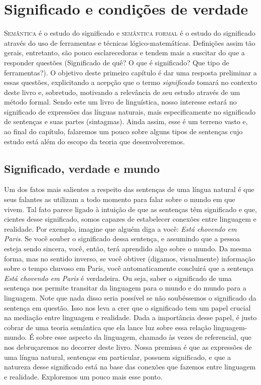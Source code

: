 
\chapter{Significado e condições de verdade}


\textsc{Semântica} é o estudo do significado e \textsc{semântica formal} é o estudo
do significado através do uso de ferramentas e técnicas
lógico-matemáticas. Definições assim tão gerais, entretanto,
são pouco esclarecedoras e tendem mais a suscitar do que a responder
questões (Significado de quê? O que é significado? Que tipo de
ferramentas?). O objetivo deste primeiro capítulo é dar uma
resposta preliminar a essas questões, explicitando a acepção que
o termo \textit{significado} tomará no contexto deste livro e,
sobretudo, motivando a relevância de seu estudo através de um
método formal. Sendo este um livro de linguística, nosso interesse
estará no significado de expressões das línguas naturais, mais
especificamente no significado de sentenças e suas partes
(sintagmas). Ainda assim, esse é um terreno vasto e, ao final do
capítulo, falaremos um pouco sobre alguns tipos de sentenças
cujo estudo está além do escopo da teoria que desenvolveremos.



\section{Significado, verdade e mundo}

Um dos fatos mais salientes a respeito das sentenças de uma língua natural é que seus falantes as utilizam a todo momento para falar sobre o mundo em que vivem. Tal fato parece ligado à intuição de que as sentenças têm significado e que, cientes desse significado, somos capazes de estabelecer conexões entre linguagem e realidade. Por exemplo, imagine que alguém diga a você: \textit{Está chovendo em Paris}. Se você souber o significado dessa sentença, e assumindo que a pessoa esteja sendo sincera, você, então, terá aprendido algo sobre o mundo. Da mesma forma, mas no sentido inverso, se você obtiver (digamos, visualmente) informação sobre o tempo chuvoso em Paris, você automaticamente concluirá que a sentença \textit{Está chovendo em Paris} é verdadeira. Ou seja, saber o significado de uma sentença nos permite transitar da linguagem para o mundo e do mundo para a linguagem. Note que nada disso seria possível se não soubéssemos o significado da sentença em questão. Isso nos leva a crer que o significado tem um papel crucial na mediação entre linguagem e realidade. Dada a importância desse papel, é justo cobrar de uma teoria semântica que ela lance luz sobre essa relação linguagem-mundo. É sobre esse aspecto da linguagem, chamado às vezes de referencial, que nos debruçaremos no decorrer deste livro. Nossa premissa é que as expressões de uma língua natural, sentenças em particular, possuem significado, e que a natureza desse significado está na base das conexões que fazemos entre linguagem e realidade. Exploremos um pouco mais esse ponto. 

